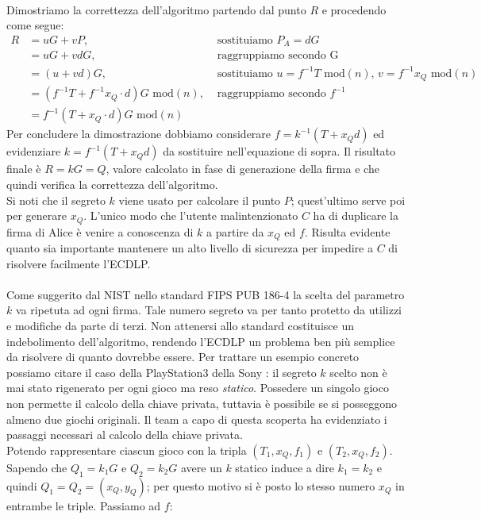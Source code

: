 \documentclass[a4paper,12pt]{tesiinfo}
\begin{document}
\\
Dimostriamo la correttezza dell'algoritmo partendo dal punto $R$ e procedendo come segue:
\begin{align*}
 R &= uG + vP, &\text{ sostituiamo } P_A = dG\\
 &= uG + vdG, &\text{ raggruppiamo secondo G }\\
 &= (u + vd)G, &\text{ sostituiamo } u = f^{-1}T \text{ mod$(n)$, } v = f^{-1}x_Q\text{ mod$(n)$}\\
 &= (f^{-1}T + f^{-1}x_Q \cdot d)G\text{ mod$(n)$}, &\text{ raggruppiamo secondo } f^{-1}\\
 &= f^{-1}(T + x_Q \cdot d)G\text{ mod$(n)$}
\end{align*}
Per concludere la dimostrazione dobbiamo considerare $f = k^{-1} (T+x_Qd)$ ed evidenziare $k = f^{-1} (T+x_Qd)$ da sostituire nell'equazione di sopra. Il risultato finale \`e $R = kG = Q$, valore calcolato in fase di generazione della firma e che quindi verifica la correttezza dell'algoritmo.
\\
Si noti che il segreto $k$ viene usato per calcolare il punto $P$; quest'ultimo serve poi per generare $x_Q$. L'unico modo che l'utente malintenzionato $C$ ha di duplicare la firma di Alice \`e venire a conoscenza di $k$ a partire da $x_Q$ ed $f$. Risulta evidente quanto sia importante mantenere un alto livello di sicurezza per impedire a $C$ di risolvere facilmente l'ECDLP.
\\
\\
Come suggerito dal NIST nello standard FIPS PUB 186-4 \cite{dss} la scelta del parametro $k$ va ripetuta ad ogni firma. Tale numero segreto va per tanto protetto da utilizzi e modifiche da parte di terzi. Non attenersi allo standard costituisce un indebolimento dell'algoritmo, rendendo l'ECDLP un problema ben pi\`u semplice da risolvere di quanto dovrebbe essere. Per trattare un esempio concreto possiamo citare il caso della PlayStation3 della Sony \cite{sony}: il segreto $k$ scelto non \`e mai stato rigenerato per ogni gioco ma reso \textit{statico}. Possedere un singolo gioco non permette il calcolo della chiave privata, tuttavia \`e possibile se si posseggono almeno due giochi originali. Il team a capo di questa scoperta ha evidenziato i passaggi necessari al calcolo della chiave privata. 
\\
Potendo rappresentare ciascun gioco con la tripla $(T_1, x_Q, f_1)$ e $(T_2, x_Q, f_2)$. Sapendo che $Q_1 = k_1G$ e $Q_2 = k_2G$ avere un $k$ statico induce a dire $k_1=k_2$ e quindi $Q_1=Q_2=(x_Q, y_Q)$; per questo motivo si \`e posto lo stesso numero $x_Q$ in entrambe le triple. Passiamo ad $f$:
\end{document}
